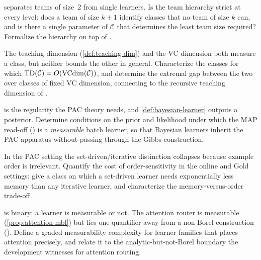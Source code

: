 \begin{openprob}
\label{op:team-hierarchy}
 separates teams of size~2 from single learners. Is the team hierarchy strict at every level: does a team of size $k+1$ identify classes that no team of size $k$ can, and is there a single parameter of $\mathcal{C}$ that determines the least team size required? Formalize the hierarchy on top of .
\end{openprob}

\begin{openprob}
\label{op:td-vc}
The teaching dimension (\cref{def:teaching-dim}) and the VC dimension both measure a class, but neither bounds the other in general. Characterize the classes for which $\mathrm{TD}(\mathcal{C}) = O(\mathrm{VCdim}(\mathcal{C}))$, and determine the extremal gap between the two over classes of fixed VC dimension, connecting to the recursive teaching dimension of .
\end{openprob}

\begin{openprob}
\label{op:bayes-measurable}
 is the regularity the PAC theory needs, and \cref{def:bayesian-learner} outputs a posterior. Determine conditions on the prior and likelihood under which the MAP read-off () is a \emph{measurable} batch learner, so that Bayesian learners inherit the PAC apparatus without passing through the Gibbs construction.
\end{openprob}

\begin{openprob}
\label{op:order-sensitivity}
In the PAC setting the set-driven/iterative distinction collapses because example order is irrelevant. Quantify the cost of order-sensitivity in the online and Gold settings: give a class on which a set-driven learner needs exponentially less memory than any iterative learner, and characterize the memory-versus-order trade-off.
\end{openprob}

\begin{openprob}
\label{op:measurability-dimension}
 is binary: a learner is measurable or not. The attention router is measurable (\cref{prop:attention-mbl}) but lies one quantifier away from a non-Borel construction (). Define a graded measurability complexity for learner families that places attention precisely, and relate it to the analytic-but-not-Borel boundary the development witnesses for attention routing.
\end{openprob}

